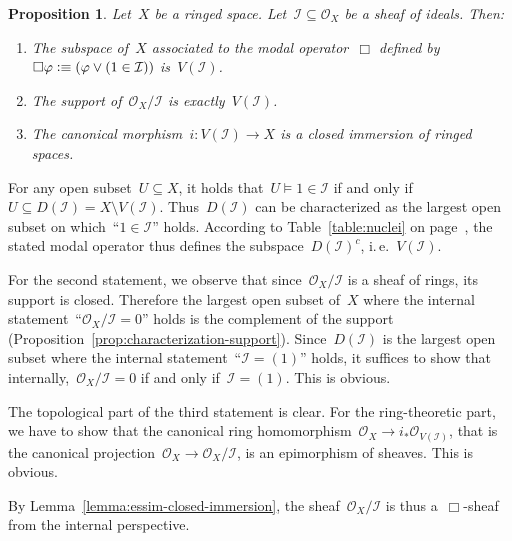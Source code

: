 \documentclass[10pt,reqno,a4paper]{amsbook}
\makeatletter
\theoremstyle{definition}
\theoremstyle{plain}
\newtheorem{prop}[defn]{Proposition}
\theoremstyle{remark}
\renewcommand{\O}{\mathcal{O}}
\newcommand{\I}{\mathcal{I}}
\newcommand{\?}{\,{:}\,}
\renewcommand{\_}{\mathpunct{.}\,}
\newcommand{\ie}{i.\,e.\@\xspace}
\newcommand{\defequiv}{\vcentcolon\equiv}
\renewenvironment{proof}[1][\proofname]{\par
  \pushQED{\qed}%
  \normalfont \topsep6\p@\@plus6\p@\relax
  \trivlist
  \item[\hskip\labelsep
        \itshape
    #1\@addpunct{.}]\ignorespaces
}{%
  \popQED\endtrivlist\@endpefalse
}
\makeatother
\begin{document}
\begin{prop}\label{prop:basics-closed-subspace}
Let~$X$ be a ringed space. Let~$\I \subseteq \O_X$ be a sheaf of ideals.
Then:
\begin{enumerate}
\item The subspace of~$X$ associated to the modal operator~$\Box$ defined
by~$\Box\varphi \defequiv (\varphi \vee (1 \in \I))$ is~$V(\I)$.
\item The support of~$\O_X/\I$ is exactly~$V(\I)$.
\item The canonical morphism~$i : V(\I) \to X$ is a closed immersion
of ringed spaces.
\end{enumerate}\end{prop}
\begin{proof}For any open subset~$U \subseteq X$, it holds that~$U \models 1
\in \I$ if and only if~$U \subseteq D(\I) = X \setminus V(\I)$. Thus~$D(\I)$
can be characterized as the largest open subset on which~``$1 \in \I$'' holds.
According to Table~\ref{table:nuclei} on page~\pageref{table:nuclei}, the
stated modal operator thus defines the subspace~$D(\I)^c$, \ie~$V(\I)$.

For the second statement, we observe that since~$\O_X/\I$ is a sheaf of rings, its
support is closed. Therefore the largest open subset of~$X$ where the internal
statement~``$\O_X/\I = 0$'' holds is the complement of the support
(Proposition~\ref{prop:characterization-support}). Since~$D(\I)$ is the largest
open subset where the internal statement~``$\I = (1)$'' holds, it suffices to
show that internally,~$\O_X/\I = 0$ if and only if~$\I = (1)$. This is obvious.

The topological part of the third statement is clear. For the ring-theoretic
part, we have to show that the canonical ring homomorphism~$\O_X \to i_*
\O_{V(\I)}$, that is the canonical projection~$\O_X \to \O_X/\I$, is an
epimorphism of sheaves. This is obvious.
\end{proof}

By Lemma~\ref{lemma:essim-closed-immersion}, the sheaf~$\O_X/\I$ is
thus a~$\Box$-sheaf from the internal perspective.
\end{document}
